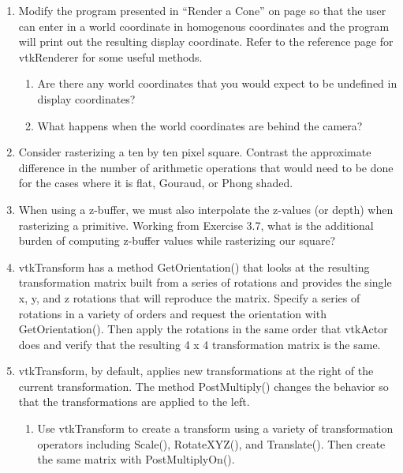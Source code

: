 \begin{enumerate}
\item Modify the program presented in ``Render a Cone'' on page \pageref{eg:render_cone} so that the user can enter in a world coordinate in homogenous coordinates and the program will print out the resulting display coordinate. Refer to the reference page for vtkRenderer for some useful methods.

\begin{enumerate}

    \item Are there any world coordinates that you would expect to be undefined in display coordinates?

    \item What happens when the world coordinates are behind the camera?

\end{enumerate}

\item Consider rasterizing a ten by ten pixel square. Contrast the approximate difference in the number of arithmetic operations that would need to be done for the cases where it is flat, Gouraud, or Phong shaded.

\item When using a z-buffer, we must also interpolate the z-values (or depth) when rasterizing a primitive. Working from Exercise 3.7, what is the additional burden of computing z-buffer values while rasterizing our square?

\item vtkTransform has a method GetOrientation() that looks at the resulting transformation matrix built from a series of rotations and provides the single x, y, and z rotations that will reproduce the matrix. Specify a series of rotations in a variety of orders and request the orientation with GetOrientation(). Then apply the rotations in the same order that vtkActor does and verify that the resulting 4 x 4 transformation matrix is the same.

\item vtkTransform, by default, applies new transformations at the right of the current transformation. The method PostMultiply() changes the behavior so that the transformations are applied to the left.

\begin{enumerate}

\item Use vtkTransform to create a transform using a variety of transformation operators including Scale(), RotateXYZ(), and Translate(). Then create the same matrix with PostMultiplyOn().


\end{enumerate}
\end{enumerate}
